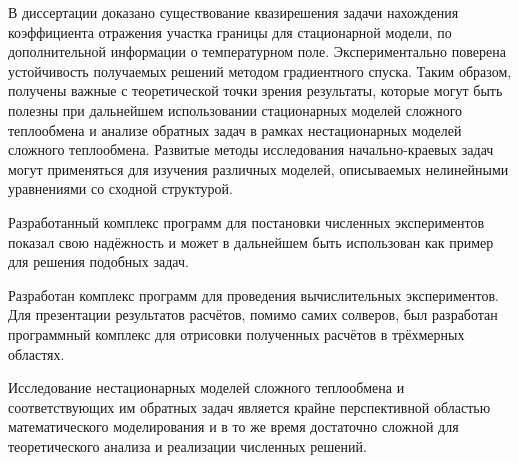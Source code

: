В диссертации доказано существование квазирешения задачи нахождения
коэффициента отражения участка границы для стационарной модели,
по дополнительной информации о температурном поле.
Экспериментально поверена устойчивость получаемых
решений методом градиентного спуска.
Таким образом, получены важные с теоретической точки зрения результаты,
которые могут быть полезны при дальнейшем использовании
стационарных моделей сложного теплообмена и анализе обратных
задач в рамках нестационарных моделей сложного теплообмена.
Развитые методы исследования начально-краевых задач могут
применяться для изучения различных моделей, описываемых нелинейными
уравнениями со сходной структурой.

Разработанный комплекс программ для постановки численных экспериментов
показал свою надёжность и может в дальнейшем быть использован как
пример для решения подобных задач.

Разработан комплекс программ для проведения вычислительных экспериментов.
Для презентации результатов расчётов, помимо самих солверов,
был разработан программный комплекс для отрисовки
полученных расчётов в трёхмерных областях.

Исследование нестационарных моделей сложного теплообмена и соответствующих им
обратных задач является крайне перспективной областью математического моделирования
и в то же время достаточно сложной для теоретического
анализа и реализации численных решений.
